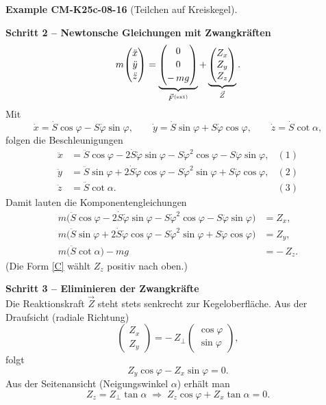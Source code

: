 \documentclass[10pt, letterpaper]{article}
\newcommand{\CustomHeading}[3]{%
  \par\medskip\noindent%
  \textbf{#1 #2} \textnormal{(#3)}.\enskip%
}
\newenvironment{EXA}[2]{\begin{unitbox}\CustomHeading{Example}{#1}{#2}}{\end{unitbox}}
\begin{document}
\begin{EXA}{CM-K25c-08-16}{Teilchen auf Kreiskegel}
\textbf{Schritt 2 – Newtonsche Gleichungen mit Zwangkräften}\\
\[
  m\!
  \begin{pmatrix}
    \ddot x\\ \ddot y\\ \ddot z
  \end{pmatrix}
  =
  \underbrace{%
  \begin{pmatrix}
    0\\[2pt] 0\\[2pt] -\,mg
  \end{pmatrix}}_{\vec F^{\text{(ext)}}}
  +
  \underbrace{%
  \begin{pmatrix}
    Z_x\\ Z_y\\ Z_z
  \end{pmatrix}}_{\vec Z}.
\]
Mit
\[
  \dot x = \dot S\cos\varphi - S\dot\varphi\sin\varphi,\qquad
  \dot y = \dot S\sin\varphi + S\dot\varphi\cos\varphi,\qquad
  \dot z = \dot S\cot\alpha,
\]
folgen die Beschleunigungen
\begin{align}
  \ddot x &= \ddot S\cos\varphi - 2\dot S\dot\varphi\sin\varphi
             - S\dot\varphi^{2}\cos\varphi - S\ddot\varphi\sin\varphi,
             &(1)\nonumber\\[2pt]
  \ddot y &= \ddot S\sin\varphi + 2\dot S\dot\varphi\cos\varphi
             - S\dot\varphi^{2}\sin\varphi + S\ddot\varphi\cos\varphi,
             &(2)\nonumber\\[2pt]
  \ddot z &= \ddot S\cot\alpha. &(3)\nonumber
\end{align}
Damit lauten die Komponenten­gleichungen
\begin{align}
  m\bigl(\ddot S\cos\varphi - 2\dot S\dot\varphi\sin\varphi
        - S\dot\varphi^{2}\cos\varphi - S\ddot\varphi\sin\varphi\bigr) &= Z_x, \tag{A}\\[2pt]
  m\bigl(\ddot S\sin\varphi + 2\dot S\dot\varphi\cos\varphi
        - S\dot\varphi^{2}\sin\varphi + S\ddot\varphi\cos\varphi\bigr) &= Z_y, \tag{B}\\[2pt]
  m\bigl(\ddot S\cot\alpha\bigr) - mg &= -\,Z_z. \tag{C}
\end{align}
(Die Form \eqref{C} wählt $Z_z$ positiv nach oben.)

\textbf{Schritt 3 – Eliminieren der Zwangkräfte}\\
Die Reaktionskraft $\vec Z$ steht stets senkrecht zur Kegeloberfläche.  
Aus der Draufsicht (radiale Richtung)
\[
  \begin{pmatrix} Z_x\\ Z_y \end{pmatrix}
    = -\,Z_\perp\!\begin{pmatrix}\cos\varphi\\ \sin\varphi\end{pmatrix},
\]
folgt
\[
  Z_y\cos\varphi - Z_x\sin\varphi = 0. \tag{D}
\]
Aus der Seitenansicht (Neigungswinkel $\alpha$) erhält man
\[
  Z_z = Z_\perp\tan\alpha
  \;\Longrightarrow\;
  Z_z\cos\varphi + Z_x\tan\alpha = 0. \tag{E}
\]


\end{EXA}
\end{document}
